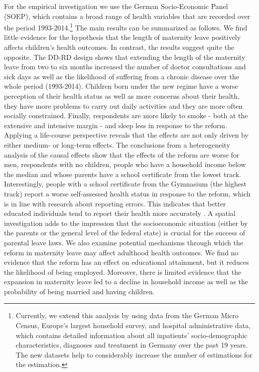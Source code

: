 \documentclass[a4paper ]{article}
\begin{document}
For the empirical investigation we use the German Socio-Economic Panel (SOEP), which contains a broad range of health variables that are recorded over the period 1993-2014.\footnote{Currently, we extend this analysis by using data from the German Micro Census, Europe's largest household survey, and hospital administrative data, which contains detailed information about all inpatients' socio-demographic characteristics, diagnoses and treatment in Germany over the past 19 years. The new datasets help to considerably increase the number of estimations for the estimation. }
The main results can be summarized as follows. We find little evidence for the hypothesis that the length of maternity leave positively affects children's health outcomes. In contrast, the results suggest quite the opposite. The DD-RD design shows that extending the length of the maternity leave from two to six months increased the number of doctor consultations and sick days as well as the likelihood of suffering from a chronic disease over the whole period (1993-2014). Children born under the new regime have a worse perception of their health status as well as more concerns about their health, they have more problems to carry out daily activities and they are more often socially constrained. Finally, respondents are more likely to smoke - both at the extensive and intensive margin - and sleep less in response to the reform. Applying a life-course perspective reveals that the effects are not only driven by either medium- or long-term effects. The conclusions from a heterogeneity analysis of the causal effects show that the effects of the reform are worse for men, respondents with no children, people who have a household income below the median and whose parents have a school certificate from the lowest track. Interestingly, people with a school certificate from the Gymnasium (the highest track) report a worse self-assessed health status in response to the reform, which is in line with research about reporting errors. This indicates that better educated individuals tend to report their health more accurately \citep{cawley2015health}. A spatial investigation adds to the impression that the socioeconomic situation (either by the parents or the general level of the federal state) is crucial for the success of parental leave laws. We also examine potential mechanisms through which the reform in maternity leave may affect adulthood health outcomes. We find no evidence that the reform has an effect on educational attainment, but it reduces the likelihood of being employed. Moreover, there is limited evidence that the expansion in maternity leave led to a decline in household income as well as the probability of being married and having children.\newline
\end{document}
